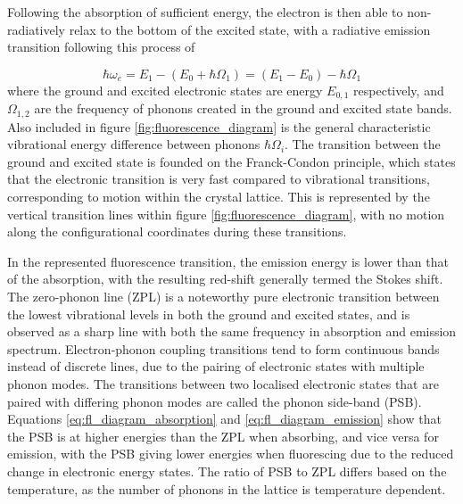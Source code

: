 Following the absorption of sufficient energy, the electron is then able to non-radiatively relax to the bottom of the excited state, with a radiative emission transition following this process of 

\begin{equation}
    \hbar\omega_{e} = E_{1}-\left(E_{0}+\hbar\Omega_{1}\right)=\left(E_{1}-E_{0}\right)-\hbar\Omega_{1}
    \label{eq:fl_diagram_emission}
\end{equation}
where the ground and excited electronic states are energy $E_{0,1}$ respectively, and $\Omega_{1,2}$ are the frequency of phonons created in the ground and excited state bands. Also included in figure \ref{fig:fluorescence_diagram} is the general characteristic vibrational energy difference between phonons $\hbar\Omega_{i}$. The transition between the ground and excited state is founded on the Franck-Condon principle, which states that the electronic transition is very fast compared to vibrational transitions, corresponding to motion within the crystal lattice. This is represented by the vertical transition lines within figure \ref{fig:fluorescence_diagram}, with no motion along the configurational coordinates during these transitions.

In the represented fluorescence transition, the emission energy is lower than that of the absorption, with the resulting red-shift generally termed the Stokes shift. The zero-phonon line (ZPL) is a noteworthy pure electronic transition between the lowest vibrational levels in both the ground and excited  states, and is observed as a sharp line with both the same frequency in absorption and emission spectrum. Electron-phonon coupling transitions tend to form continuous bands instead of discrete lines, due to the pairing of electronic states with multiple phonon modes. The transitions between two localised electronic states that are paired with differing phonon modes are called the phonon side-band (PSB). Equations \ref{eq:fl_diagram_absorption} and \ref{eq:fl_diagram_emission} show that the PSB is at higher energies than the ZPL when absorbing, and vice versa for emission, with the PSB giving lower energies when fluorescing due to the reduced change in electronic energy states. The ratio of PSB to ZPL differs based on the temperature, as the number of phonons in the lattice is temperature dependent.

